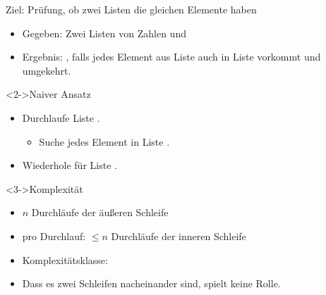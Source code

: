 \begin{frame}
    \begin{block}{Ziel: Prüfung, ob zwei Listen die gleichen Elemente haben}
        \begin{itemize}
            \item Gegeben: Zwei Listen von Zahlen  und 
            \item Ergebnis: , falls jedes Element aus Liste  auch in Liste  vorkommt und umgekehrt.
        \end{itemize}
    \end{block}
    \begin{block}<2->{Naiver Ansatz}
        \begin{itemize}
            \item Durchlaufe Liste .
            \begin{itemize}
                \item Suche jedes Element in Liste .
            \end{itemize}
            \item Wiederhole für Liste .
        \end{itemize}
    \end{block}
    \begin{block}<3->{Komplexität}
        \begin{itemize}
            \item $n$ Durchläufe der äußeren Schleife
            \item pro Durchlauf: $\leq n$ Durchläufe der inneren Schleife
            \item Komplexitätsklasse: \osquare
            \item Dass es zwei Schleifen nacheinander sind, spielt keine Rolle.
        \end{itemize}
    \end{block}
\end{frame}


